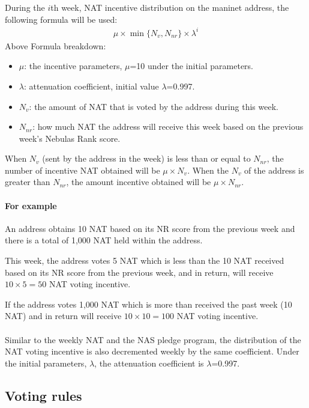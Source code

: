 During the $i$th week, NAT incentive distribution on the maninet address, the following formula will be used:
\begin{align}
\mu \times \min \{N_{v}, N_{nr}\} \times \lambda^{i}
\end{align}
Above Formula breakdown:

\begin{itemize}
	\item $\mu$: the incentive parameters, $\mu$=10 under the initial parameters.
	\item $\lambda$: attenuation coefficient, initial value $\lambda$=0.997.
	\item $N_{v}$: the amount of NAT that is voted by the address during this week.
	\item $N_{nr}$: how much NAT the address will receive this week based on the previous week's Nebulas Rank score.
\end{itemize}
\noindent When $N_{v}$ (sent by the address in the week) is less than or equal
to $N_{nr}$, the number of incentive NAT obtained will be $\mu\times N_{v}$. When the $N_{v}$ of the address is greater than $N_{nr}$, the amount incentive obtained will be $\mu\times N_{nr}$.

\paragraph{For example}

An address obtains 10 NAT based on its NR score from the previous week and there is a total of 1,000 NAT held within the address.

This week, the address votes 5 NAT which is less than the 10 NAT received based on its NR score from the previous week, and in return, will receive $10\times5=50$ NAT voting incentive.

If the address votes 1,000 NAT which is more than received the past week (10 NAT) and in return will receive $10\times10=100$ NAT voting incentive.

\paragraph{}
Similar to the weekly NAT and the NAS pledge program, the distribution of the NAT voting incentive is also decremented weekly by the same coefficient. Under the initial parameters, $\lambda$, the attenuation coefficient is $\lambda$=0.997.

\subsection{Voting rules}

